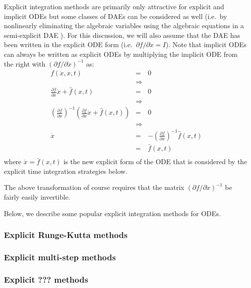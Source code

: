 \documentclass[pdf,ps2pdf,11pt]{SANDreport}
\begin{document}
Explicit integration methods are primarily only attractive for explicit and
implicit ODEs but some classes of DAEs can be considered as well (i.e.\ by
nonlinearly eliminating the algebraic variables using the algebraic equations
in a semi-explicit DAE \cite{BCP}).  For this discussion, we will also assume
that the DAE has been written in the explicit ODE form (i.e.\ ${}\partial f /
{}\partial {}\dot{x} = I$).  Note that implicit ODEs can always be written as
explicit ODEs by multiplying the implicit ODE from the right with $({}\partial
f / {}\partial {}\dot{x})^{-1}$ as:
%
\begin{eqnarray*}
f(\dot{x},x,t) & = & 0 \\
& \Rightarrow \\
\frac{\partial f}{\partial \dot{x}} \dot{x} + \hat{f}(x,t) & = & 0 \\
& \Rightarrow \\
\left( \frac{\partial f}{\partial \dot{x}} \right)^{-1}
\left( \frac{\partial f}{\partial \dot{x}} \dot{x} + \hat{f}(x,t) \right) & = & 0 \\
& \Rightarrow \\
\dot{x} & = & -\left( \frac{\partial f}{\partial \dot{x}} \right)^{-1} \hat{f}(x,t) \\
& = & \bar{f}(x,t) \\
\end{eqnarray*}
%
where ${}\dot{x} = \bar{f}(x,t)$ is the new explicit form of the ODE that is
considered by the explicit time integration strategies below.

The above transformation of course requires that the matrix $({}\partial f /
{}\partial {}\dot{x})^{-1}$ be fairly easily invertible.

Below, we describe some popular explicit integration methods for ODEs.

\subsubsection{Explicit Runge-Kutta methods}

\subsubsection{Explicit multi-step methods}

\subsubsection{Explicit ??? methods}
\end{document}
